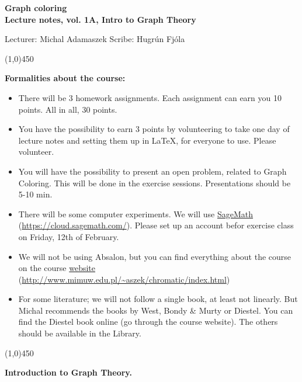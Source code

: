 \documentclass[a4paper]{article}
\theoremstyle{plain}
\theoremstyle{myremark}
\newcommand{\LECTURENUMBER}{1A}
\newcommand{\LECTURETITLE}{Intro to Graph Theory}
\newcommand{\LECTURESCRIBE}{Hugr\'un Fj\'ola}
\begin{document}
\thispagestyle{empty}

\begin{center}
	{\Large\bf Graph coloring}\\
	{\bf Lecture notes, vol. \LECTURENUMBER, \LECTURETITLE}\\
\end{center}
Lecturer: Michal Adamaszek \hfill Scribe: \LECTURESCRIBE
\begin{center}
\line(1,0){450}
\end{center}



{\bf Formalities about the course:}
\begin{itemize}
\item There will be 3 homework assignments. Each assignment can earn you 10 points. All in all, 30 points.
\item You have the possibility to earn 3 points by volunteering to take one day of lecture notes and setting them up in LaTeX, for everyone to use. Please volunteer.
\item You will have the possibility to present an open problem, related to Graph Coloring. This will be done in the exercise sessions. Presentations should be 5-10 min.
\item There will be some computer experiments. We will use \href{https://cloud.sagemath.com/}{SageMath} (\url{https://cloud.sagemath.com/}). Please set up an account befor exercise class on Friday, 12th of February.
\item We will not be using Absalon, but you can find everything about the course on the course \href{http://www.mimuw.edu.pl/~aszek/chromatic/index.html}{website} (\url{http://www.mimuw.edu.pl/~aszek/chromatic/index.html})

\item For some literature; we will not follow a single book, at least not linearly. But Michal recommends the books by West, Bondy \& Murty or Diestel. You can find the Diestel book online (go through the course website). The others should be available in the Library.
\end{itemize}

\begin{center}
\line(1,0){450}
\end{center}

{\bf \large \noindent Introduction to Graph Theory.}
\newline
\end{document}
